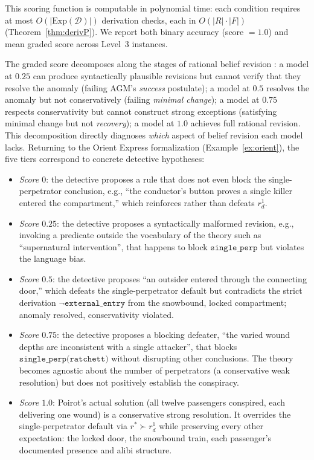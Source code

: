 \documentclass{article}
\theoremstyle{definition}
\newcommand{\D}{\mathcal{D}}
\newcommand{\Exp}{\mathrm{Exp}}
\begin{document}
This scoring function is computable in polynomial time: each condition requires at most $O(|\Exp(\D)|)$ derivation checks, each in $O(|R| \cdot |F|)$ (Theorem~\ref{thm:derivP}). We report both binary accuracy (score $= 1.0$) and mean graded score across Level~3 instances.

The graded score decomposes along the stages of rational belief revision \cite{gardenfors1988knowledge}: a model at $0.25$ can produce syntactically plausible revisions but cannot verify that they resolve the anomaly (failing AGM's \emph{success} postulate); a model at $0.5$ resolves the anomaly but not conservatively (failing \emph{minimal change}); a model at $0.75$ respects conservativity but cannot construct strong exceptions (satisfying minimal change but not \emph{recovery}); a model at $1.0$ achieves full rational revision. This decomposition directly diagnoses \emph{which} aspect of belief revision each model lacks. Returning to the Orient Express formalization (Example~\ref{ex:orient}), the five tiers correspond to concrete detective hypotheses:
\begin{itemize}[nosep]
\item \textit{Score $0$}: the detective proposes a rule that does not even block the single-perpetrator conclusion, e.g., ``the conductor's button proves a single killer entered the compartment,'' which reinforces rather than defeats $r_d^1$.
\item \textit{Score $0.25$}: the detective proposes a syntactically malformed revision, e.g., invoking a predicate outside the vocabulary of the theory such as ``supernatural intervention'', that happens to block $\texttt{single\_perp}$ but violates the language bias.
\item \textit{Score $0.5$}: the detective proposes ``an outsider entered through the connecting door,'' which defeats the single-perpetrator default but contradicts the strict derivation $\neg\texttt{external\_entry}$ from the snowbound, locked compartment; anomaly resolved, conservativity violated.
\item \textit{Score $0.75$}: the detective proposes a blocking defeater, ``the varied wound depths are inconsistent with a single attacker'', that blocks $\texttt{single\_perp(ratchett)}$ without disrupting other conclusions. The theory becomes agnostic about the number of perpetrators (a conservative weak resolution) but does not positively establish the conspiracy.
\item \textit{Score $1.0$}: Poirot's actual solution (all twelve passengers conspired, each delivering one wound) is a conservative strong resolution. It overrides the single-perpetrator default via $r^* \succ r_d^1$ while preserving every other expectation: the locked door, the snowbound train, each passenger's documented presence and alibi structure.
\end{itemize}
\end{document}

